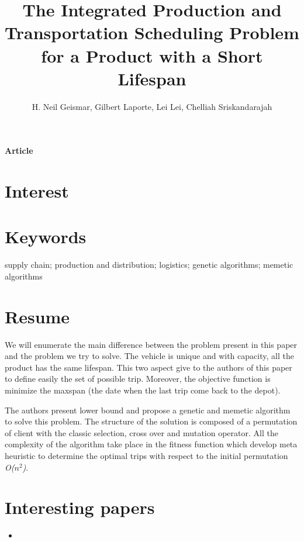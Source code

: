 \documentclass{article}
\title{The Integrated Production and Transportation
Scheduling Problem for a Product
with a Short Lifespan}
\author{H. Neil Geismar, Gilbert Laporte, Lei Lei, Chelliah Sriskandarajah}
\begin{document}
\maketitle

\textbf{Article}

\section*{Interest}


\section*{Keywords }
supply chain; production and distribution; logistics; genetic algorithms; memetic algorithms

\section*{Resume}

We will enumerate the main difference between the problem present in this paper and the problem we try to solve. The vehicle is unique and with capacity, all the product has the same lifespan. This two aspect give to the authors of this paper to define easily the set of possible trip. Moreover, the objective function is minimize the maxspan (the date when the last trip come back to the depot).

\vspace{0.4cm}



The authors present lower bound and propose a genetic and memetic algorithm to solve this problem. The structure of the solution is composed of a permutation of client with the classic selection, cross over and mutation operator. All the complexity of the algorithm take place in the fitness function which develop meta heuristic to determine the optimal trips with respect to the initial permutation \textit{O($n^2$)}.


\section*{Interesting papers}
\begin{itemize}
\item
\end{itemize}
\end{document}
